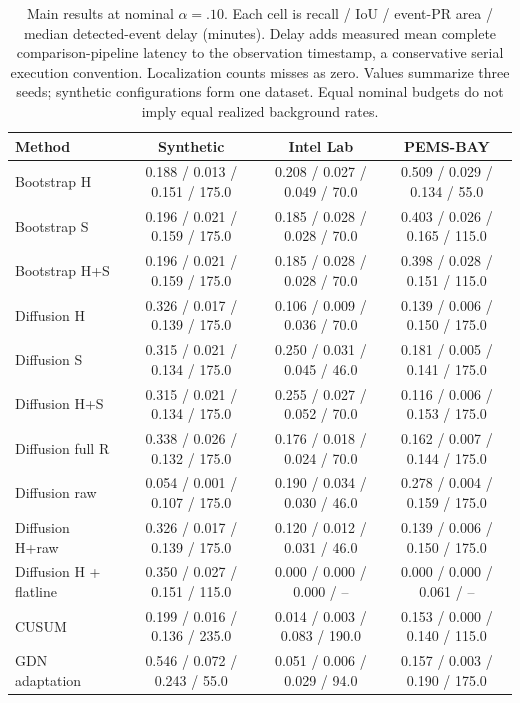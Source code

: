 \begin{table}[t]
\centering\caption{Main results at nominal $\alpha=.10$. Each cell is recall / IoU / event-PR area / median detected-event delay (minutes). Delay adds measured mean complete comparison-pipeline latency to the observation timestamp, a conservative serial execution convention. Localization counts misses as zero. Values summarize three seeds; synthetic configurations form one dataset. Equal nominal budgets do not imply equal realized background rates.}
\label{tab:main}\footnotesize\setlength{\tabcolsep}{4pt}
\begin{tabular}{lccc}
\toprule Method & Synthetic & Intel Lab & PEMS-BAY\\\midrule
Bootstrap H & 0.188 / 0.013 / 0.151 / 175.0 & 0.208 / 0.027 / 0.049 / 70.0 & 0.509 / 0.029 / 0.134 / 55.0 \\
Bootstrap S & 0.196 / 0.021 / 0.159 / 175.0 & 0.185 / 0.028 / 0.028 / 70.0 & 0.403 / 0.026 / 0.165 / 115.0 \\
Bootstrap H+S & 0.196 / 0.021 / 0.159 / 175.0 & 0.185 / 0.028 / 0.028 / 70.0 & 0.398 / 0.028 / 0.151 / 115.0 \\
Diffusion H & 0.326 / 0.017 / 0.139 / 175.0 & 0.106 / 0.009 / 0.036 / 70.0 & 0.139 / 0.006 / 0.150 / 175.0 \\
Diffusion S & 0.315 / 0.021 / 0.134 / 175.0 & 0.250 / 0.031 / 0.045 / 46.0 & 0.181 / 0.005 / 0.141 / 175.0 \\
Diffusion H+S & 0.315 / 0.021 / 0.134 / 175.0 & 0.255 / 0.027 / 0.052 / 70.0 & 0.116 / 0.006 / 0.153 / 175.0 \\
Diffusion full R & 0.338 / 0.026 / 0.132 / 175.0 & 0.176 / 0.018 / 0.024 / 70.0 & 0.162 / 0.007 / 0.144 / 175.0 \\
Diffusion raw & 0.054 / 0.001 / 0.107 / 175.0 & 0.190 / 0.034 / 0.030 / 46.0 & 0.278 / 0.004 / 0.159 / 175.0 \\
Diffusion H+raw & 0.326 / 0.017 / 0.139 / 175.0 & 0.120 / 0.012 / 0.031 / 46.0 & 0.139 / 0.006 / 0.150 / 175.0 \\
Diffusion H + flatline & 0.350 / 0.027 / 0.151 / 115.0 & 0.000 / 0.000 / 0.000 / -- & 0.000 / 0.000 / 0.061 / -- \\
CUSUM & 0.199 / 0.016 / 0.136 / 235.0 & 0.014 / 0.003 / 0.083 / 190.0 & 0.153 / 0.000 / 0.140 / 115.0 \\
GDN adaptation & 0.546 / 0.072 / 0.243 / 55.0 & 0.051 / 0.006 / 0.029 / 94.0 & 0.157 / 0.003 / 0.190 / 175.0 \\
\bottomrule\end{tabular}
\end{table}
